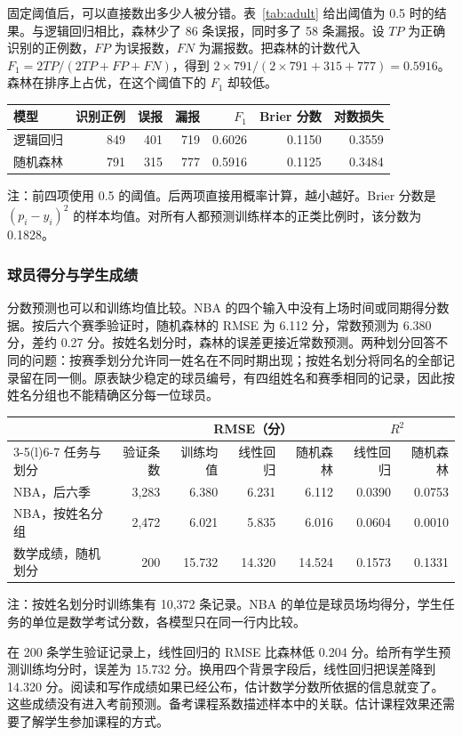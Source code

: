 \documentclass[12pt,journal,onecolumn,a4paper]{IEEEtran}
\newcommand{\tabnote}[1]{\par\vspace{2pt}\begin{minipage}{\linewidth}\footnotesize #1\end{minipage}}
\newcommand{\inlinetab}[1]{\par\smallskip\noindent\begin{minipage}{\linewidth}\centering\small #1\end{minipage}\par\smallskip}
\begin{document}
固定阈值后，可以直接数出多少人被分错。表~\ref{tab:adult} 给出阈值为 0.5 时的结果。与逻辑回归相比，森林少了 86 条误报，同时多了 58 条漏报。设 $TP$ 为正确识别的正例数，$FP$ 为误报数，$FN$ 为漏报数。把森林的计数代入 $F_1=2TP/(2TP+FP+FN)$，得到 $2\times791/(2\times791+315+777)=0.5916$。森林在排序上占优，在这个阈值下的 $F_1$ 却较低。
\inlinetab{\label{tab:adult}
\begin{tabular}{@{}lrrrrrr@{}}\toprule
模型 & 识别正例 & 误报 & 漏报 & $F_1$ & Brier 分数 & 对数损失\\\midrule
逻辑回归 & 849 & 401 & 719 & 0.6026 & 0.1150 & 0.3559\\
随机森林 & 791 & 315 & 777 & 0.5916 & 0.1125 & 0.3484\\\bottomrule\end{tabular}
\tabnote{注：前四项使用 0.5 的阈值。后两项直接用概率计算，越小越好。Brier 分数是 $(p_i-y_i)^2$ 的样本均值。对所有人都预测训练样本的正类比例时，该分数为 0.1828。}}
\FloatBarrier
\subsubsection{球员得分与学生成绩}
分数预测也可以和训练均值比较。NBA 的四个输入中没有上场时间或同期得分数据。按后六个赛季验证时，随机森林的 RMSE 为 6.112 分，常数预测为 6.380 分，差约 0.27 分。按姓名划分时，森林的误差更接近常数预测。两种划分回答不同的问题：按赛季划分允许同一姓名在不同时期出现；按姓名划分将同名的全部记录留在同一侧。原表缺少稳定的球员编号，有四组姓名和赛季相同的记录，因此按姓名分组也不能精确区分每一位球员。
\inlinetab{\label{tab:scores}
\begin{tabular}{@{}lrrrrrr@{}}\toprule
 & & \multicolumn{3}{c}{RMSE（分）} & \multicolumn{2}{c}{$R^2$}\\\cmidrule(lr){3-5}\cmidrule(l){6-7}
任务与划分 & 验证条数 & 训练均值 & 线性回归 & 随机森林 & 线性回归 & 随机森林\\\midrule
NBA，后六季 & 3,283 & 6.380 & 6.231 & 6.112 & 0.0390 & 0.0753\\
NBA，按姓名分组 & 2,472 & 6.021 & 5.835 & 6.016 & 0.0604 & 0.0010\\
数学成绩，随机划分 & 200 & 15.732 & 14.320 & 14.524 & 0.1573 & 0.1331\\\bottomrule\end{tabular}
\tabnote{注：按姓名划分时训练集有 10,372 条记录。NBA 的单位是球员场均得分，学生任务的单位是数学考试分数，各模型只在同一行内比较。}}

在 200 条学生验证记录上，线性回归的 RMSE 比森林低 0.204 分。给所有学生预测训练均分时，误差为 15.732 分。换用四个背景字段后，线性回归把误差降到 14.320 分。阅读和写作成绩如果已经公布，估计数学分数所依据的信息就变了。这些成绩没有进入考前预测。备考课程系数描述样本中的关联。估计课程效果还需要了解学生参加课程的方式。
\end{document}
